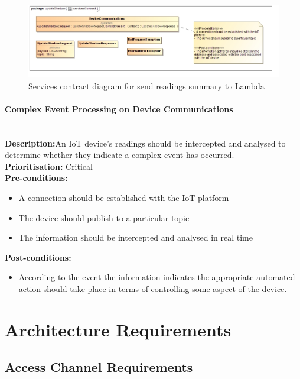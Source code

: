 \documentclass{article}
\begin{document}
\begin{figure}[H]
	\includegraphics[width=\linewidth]{images/ServicesContracts/updateShadow.jpg}
	\caption{Services contract diagram for send readings summary to Lambda}
\end{figure}

\paragraph{Complex Event Processing on Device Communications}\mbox{}\\
\textbf{Description:}An IoT device's readings should be intercepted and analysed to determine whether they indicate a complex event has occurred.\\
\textbf{Prioritisation:} Critical\\		
\textbf{Pre-conditions:}
\begin{itemize}
	\item A connection should be established with the IoT platform
	\item The device should publish to a particular topic
	\item The information should be intercepted and analysed in real time
\end{itemize}
\textbf{Post-conditions:}
\begin{itemize}
	\item According to the event the information indicates the appropriate automated action should take place in terms of controlling some aspect of the device.
\end{itemize}

\section{Architecture Requirements}

\subsection{Access Channel Requirements}
\end{document}
